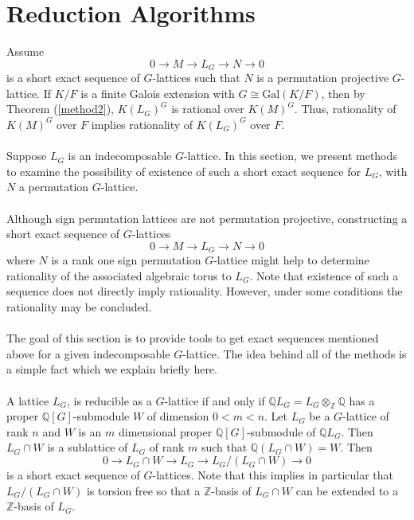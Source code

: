 \documentclass{article}
\theoremstyle{plain}
\theoremstyle{definition}
\newcommand{\Z}{\ensuremath{\mathbb{Z}}}
\newcommand{\Q}{\ensuremath{\mathbb{Q}}}
\begin{document}
\section{Reduction Algorithms}
Assume $$0 \rightarrow M  \rightarrow L_G \rightarrow N \rightarrow 0$$ is a short exact sequence of $G$-lattices such that $N$ is a permutation projective $G$-lattice. If $K/F$ is a finite Galois extension with $G \cong \mathrm{Gal}(K/F)$, then by Theorem (\ref{method2}), $K(L_G)^G$ is rational over $K(M)^G$. Thus, rationality of $K(M)^G$ over $F$ implies rationality of $K(L_G)^G$ over $F$.\\
\\
Suppose $L_G$ is an indecomposable $G$-lattice. In this section, we present methods to examine the possibility of existence of such a short exact sequence for $L_G$, with $N$ a permutation $G$-lattice.\\
\\
Although sign permutation lattices are not permutation projective, constructing a short exact sequence of $G$-lattices $$0 \rightarrow M  \rightarrow L_G \rightarrow N \rightarrow 0$$ where $N$ is a rank one sign permutation $G$-lattice might help to determine rationality of the associated algebraic torus to $L_G$. Note that existence of such a sequence does not directly imply rationality. However, under some conditions the rationality may be concluded. \\
\\
The goal of this section is to provide tools to get exact sequences mentioned above for a given indecomposable $G$-lattice. The idea behind all of the methods is a simple fact which we explain briefly here.  \\
\\
A lattice $L_G$, is reducible as a $G$-lattice if and only if $\Q L_G = L_G \otimes_{\Z} \Q$ has a proper $\Q[G]$-submodule $W$ of dimension $0 < m < n$. Let $L_G$ be a $G$-lattice of rank $n$ and $W$ is an $m$ dimensional proper $\Q[G]$-submodule of $\Q L_G$. Then $L_G \cap W$ is a sublattice of $L_G$ of rank $m$ such that $\Q (L_G \cap W) = W$. Then
$$0 \rightarrow L_G \cap W  \rightarrow L_G \rightarrow L_G/(L_G \cap W) \rightarrow 0$$
 is a short exact sequence of $G$-lattices. Note that this implies in particular that $L_G/(L_G \cap W)$ is torsion free so that a $\Z$-basis of $L_G \cap W$ can be extended to a $\Z$-basis of $L_G$.\\
\end{document}
